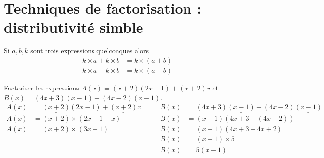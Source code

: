 \section{Techniques de factorisation : distributivité simble}
\begin{propriete}
    Si $a,b,k$  sont trois expressions quelconques alors 
    \begin{align*}
        k\times a+k\times b&=k\times(a+b)\\
        k\times a-k\times b&=k\times(a-b)
    \end{align*}
\end{propriete}

\begin{exemples*1}
    Factoriser les expressions $A(x)=(x+2)(2x-1)+(x+2)x$ et $B(x)=(4x+3)(x-1)-(4x-2)(x-1)$. 
    \begin{align*}
        A(x)&=\underline{(x+2)}(2x-1)+\underline{(x+2)}x\qquad&B(x)&=(4x+3)\underline{(x-1)}-(4x-2)\underline{(x-1)}\\
        A(x)&=(x+2)\times(2x-1+x)                             &B(x)&=(x-1)(4x+3-(4x-2))\\
        A(x)&=(x+2)\times(3x-1)                               &B(x)&=(x-1)(4x+3-4x+2)\\
         &                                                    &B(x)&=(x-1)\times5\\
         &                                                    &B(x)&=5(x-1)         
    \end{align*}
    \vspace*{-7mm}
\end{exemples*1}
